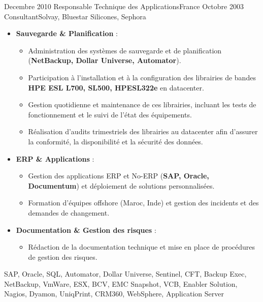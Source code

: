 \begin{experiences}
\consultantexperience
    {Decembre 2010} {Responsable Technique des Applications}{}{France}
    {Octobre 2003}    {Consultant}{Solvay, Bluestar Silicones, Sephora} {
        \begin{itemize}[left=0pt,label={},itemsep=0.5em]

          \item \textbf{Sauvegarde \& Planification} :
            \begin{itemize}[itemsep=0.2em,topsep=0.2em,parsep=0pt]
              \small
              \item Administration des systèmes de sauvegarde et de planification (\textbf{NetBackup, Dollar Universe, Automator}).
              \item Participation à l'installation et à la configuration des librairies de bandes \textbf{HPE ESL L700, SL500, HPESL322e} en datacenter.
              \item Gestion quotidienne et maintenance de ces librairies, incluant les tests de fonctionnement et le suivi de l'état des équipements.
              \item Réalisation d'audits trimestriels des librairies au datacenter afin d'assurer la conformité, la disponibilité et la sécurité des données.
            \end{itemize}


          \vspace{0.3em}

          \item \textbf{ERP \& Applications} :
            \begin{itemize}[itemsep=0.2em,topsep=0.2em,parsep=0pt]
              \small
              \item Gestion des applications ERP et No-ERP (\textbf{SAP, Oracle, Documentum}) et déploiement de solutions personnalisées.
              \item Formation d'équipes offshore (Maroc, Inde) et gestion des incidents et des demandes de changement.
            \end{itemize}

          \vspace{0.3em}

          \item \textbf{Documentation \& Gestion des risques} :
            \begin{itemize}[itemsep=0.2em,topsep=0.2em,parsep=0pt]
              \small
              \item Rédaction de la documentation technique et mise en place de procédures de gestion des risques.
            \end{itemize}

        \end{itemize}
    }
    {SAP, Oracle, SQL, Automator, Dollar Universe, Sentinel, CFT, Backup Exec, NetBackup, VmWare, ESX, BCV, EMC Snapshot, VCB, Enabler Solution, Nagios, Dyamon, UniqPrint, CRM360, WebSphere, Application Server}

\emptySeparator
\end{experiences}